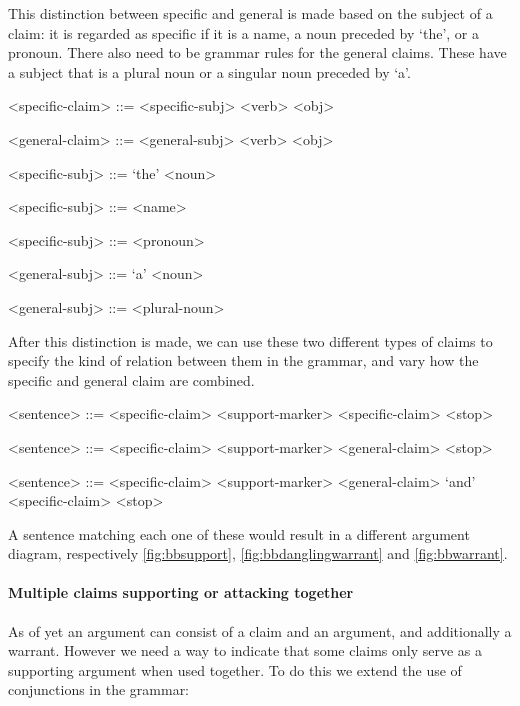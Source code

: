 This distinction between specific and general is made based on the subject of a claim: it is regarded as specific if it is a name, a noun preceded by `the', or a pronoun. There also need to be grammar rules for the general claims. These have a subject that is a plural noun or a singular noun preceded by `a'.

\begin{grammar}

<specific-claim> ::= <specific-subj> <verb> <obj>

<general-claim> ::= <general-subj> <verb> <obj>

<specific-subj> ::= `the' <noun>

<specific-subj> ::= <name>

<specific-subj> ::= <pronoun>

<general-subj> ::= `a' <noun>

<general-subj> ::= <plural-noun>

\end{grammar}

\noindent After this distinction is made, we can use these two different types of claims to specify the kind of relation between them in the grammar, and vary how the specific and general claim are combined.

\begin{grammar}

<sentence> ::= <specific-claim> <support-marker> <specific-claim> <stop>

<sentence> ::= <specific-claim> <support-marker> <general-claim> <stop>

<sentence> ::= <specific-claim> <support-marker> <general-claim> `and' <specific-claim> <stop>

\end{grammar}

\noindent A sentence matching each one of these would result in a different argument diagram, respectively \autoref{fig:bbsupport}, \autoref{fig:bbdanglingwarrant} and \autoref{fig:bbwarrant}.

\paragraph{Multiple claims supporting or attacking together} As of yet an argument can consist of a claim and an argument, and additionally a warrant. However we need a way to indicate that some claims only serve as a supporting argument when used together. To do this we extend the use of conjunctions in the grammar:

